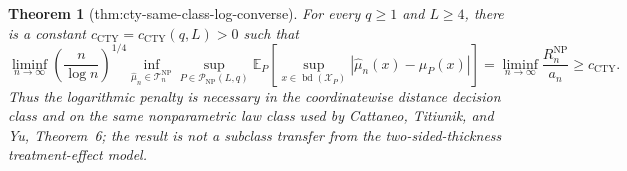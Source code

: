 \documentclass{article}
\newtheorem{theorem}{Theorem}
\begin{document}
\begin{theorem}[thm:cty-same-class-log-converse]\label{thm:cty-same-class-log-converse}
For every \(q\geq1\) and \(L\geq4\), there is a constant \(c_{\mathrm{CTY}}=c_{\mathrm{CTY}}(q,L)>0\) such that
\[
 \liminf_{n\to\infty}
 \left(\frac{n}{\log n}\right)^{1/4}
 \inf_{\widehat\mu_n\in\mathcal T_n^{\mathrm{NP}}}
 \sup_{P\in\mathcal P_{\mathrm{NP}}(L,q)}
 \mathbb E_P\!\left[
 \sup_{x\in\operatorname{bd}(\mathcal X_P)}
 |\widehat\mu_n(x)-\mu_P(x)|
 \right]
 =\liminf_{n\to\infty}\frac{R_n^{\mathrm{NP}}}{a_n}
 \geq c_{\mathrm{CTY}}.
\]
Thus the logarithmic penalty is necessary in the coordinatewise distance decision class and on the same nonparametric law class used by Cattaneo, Titiunik, and Yu, Theorem~6; the result is not a subclass transfer from the two-sided-thickness treatment-effect model.
\end{theorem}
\end{document}
